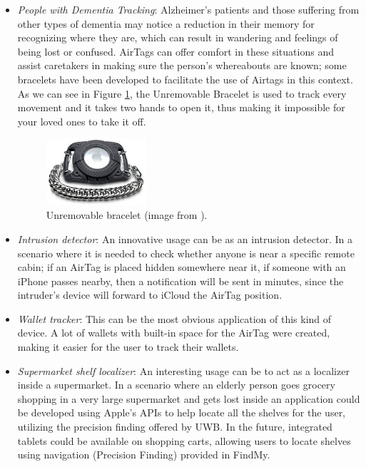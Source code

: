 \documentclass[english]{article}
\begin{document}
\begin{itemize}
  \item \textit{People with Dementia Tracking}: Alzheimer's patients and those suffering from other types of dementia may notice a reduction in their memory for recognizing where they are, which can result in wandering and feelings of being lost or confused. AirTags can offer comfort in these situations and assist caretakers in making sure the person's whereabouts are known; some bracelets have been developed to facilitate the use of Airtags in this context. As we can see in Figure \ref{img:brac}, the Unremovable Bracelet is used to track every movement and it takes two hands to open it, thus making it impossible for your loved ones to take it off.
  \begin{figure}[]
    \centering
    \includegraphics[width=0.35\textwidth]{images/AirT-Blk-Sm.jpg}
    \caption{Unremovable bracelet (image from \cite{bracelets}).}
    \label{img:brac}
  \end{figure}
  \item \textit{Intrusion detector}: An innovative usage can be as an intrusion detector. In a scenario where it is needed to check whether anyone is near a specific remote cabin; if an AirTag is placed hidden somewhere near it, if someone with an iPhone passes nearby, then a notification will be sent in minutes, since the intruder's device will forward to iCloud the AirTag position.
  \item \textit{Wallet tracker}: This can be the most obvious application of this kind of device. A lot of wallets with built-in space for the AirTag were created, making it easier for the user to track their wallets.
  \item \textit{Supermarket shelf localizer}: An interesting usage can be to act as a localizer inside a supermarket. In a scenario where an elderly person goes grocery shopping in a very large supermarket and gets lost inside an application could be developed using Apple's APIs to help locate all the shelves for the user, utilizing the precision finding offered by UWB. In the future, integrated tablets could be available on shopping carts, allowing users to locate shelves using navigation (Precision Finding) provided in FindMy.
\end{itemize}
\end{document}
